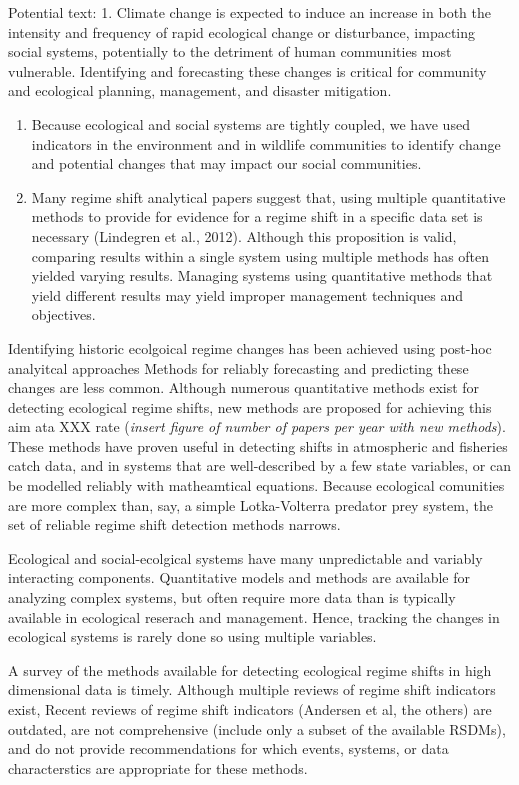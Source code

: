 \documentclass[12pt,twoside,openany]{reedthesis}
\begin{document}
Potential text:
1. Climate change is expected to induce an increase in both the intensity and frequency of rapid ecological change or disturbance, impacting social systems, potentially to the detriment of human communities most vulnerable. Identifying and forecasting these changes is critical for community and ecological planning, management, and disaster mitigation.
\begin{enumerate}
\def\labelenumi{\arabic{enumi}.}
\item
  Because ecological and social systems are tightly coupled, we have used indicators in the environment and in wildlife communities to identify change and potential changes that may impact our social communities.
\item
  Many regime shift analytical papers suggest that, using multiple quantitative methods to provide for evidence for a regime shift in a specific data set is necessary (Lindegren et al., 2012). Although this proposition is valid, comparing results within a single system using multiple methods has often yielded varying results. Managing systems using quantitative methods that yield different results may yield improper management techniques and objectives.
\end{enumerate}
Identifying historic ecolgoical regime changes has been achieved using post-hoc analyitcal approaches Methods for reliably forecasting and predicting these changes are less common. Although numerous quantitative methods exist for detecting ecological regime shifts, new methods are proposed for achieving this aim ata XXX rate (\emph{insert figure of number of papers per year with new methods}). These methods have proven useful in detecting shifts in atmospheric and fisheries catch data, and in systems that are well-described by a few state variables, or can be modelled reliably with matheamtical equations. Because ecological comunities are more complex than, say, a simple Lotka-Volterra predator prey system, the set of reliable regime shift detection methods narrows.

Ecological and social-ecolgical systems have many unpredictable and variably interacting components. Quantitative models and methods are available for analyzing complex systems, but often require more data than is typically available in ecological reserach and management. Hence, tracking the changes in ecological systems is rarely done so using multiple variables.

A survey of the methods available for detecting ecological regime shifts in high dimensional data is timely. Although multiple reviews of regime shift indicators exist, Recent reviews of regime shift indicators (Andersen et al, the others) are outdated, are not comprehensive (include only a subset of the available RSDMs), and do not provide recommendations for which events, systems, or data characterstics are appropriate for these methods.
\end{document}
